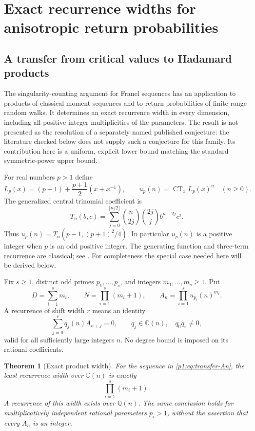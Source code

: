 \documentclass[11pt,a4paper]{article}
\newtheorem{theorem}{Theorem}[section]
\theoremstyle{definition}
\theoremstyle{remark}
\numberwithin{equation}{section}
\begin{document}
\section{Exact recurrence widths for anisotropic return probabilities}
\label{p1:sec:transfer-recurrences}

\subsection{A transfer from critical values to Hadamard products}

The singularity-counting argument for Franel sequences has an application
to products of classical moment sequences and to return probabilities of
finite-range random walks.  It determines an exact recurrence width in every
dimension, including all positive integer multiplicities of the parameters.
The result is not presented as the resolution of a separately named published
conjecture: the literature checked below does not supply such a conjecture for
this family.  Its contribution here is a uniform, explicit lower bound matching
the standard symmetric-power upper bound.

For real numbers $p>1$ define
\begin{equation}\label{p1:eq:transfer-Lp}
 L_p(x)=(p-1)+\frac{p+1}{2}(x+x^{-1}),\qquad
 u_p(n)=\operatorname{CT}_x L_p(x)^n \quad(n\geq0).
\end{equation}
The generalized central trinomial coefficient is
\[
 T_n(b,c)=\sum_{j=0}^{\lfloor n/2\rfloor}
 \binom n{2j}\binom{2j}j b^{n-2j}c^j.
\]
Thus $u_p(n)=T_n(p-1,(p+1)^2/4)$.  In particular $u_p(n)$ is a
positive integer when $p$ is an odd positive integer.  The generating
function and three-term recurrence are classical; see
\cite{p1:Noe2006transfer,p1:LWW2023transfer}.  For completeness the special
case needed here will be derived below.

Fix $s\geq1$, distinct odd primes $p_1,\ldots,p_s$, and integers
$m_1,\ldots,m_s\geq1$.  Put
\begin{equation}\label{p1:eq:transfer-An}
 D=\sum_{i=1}^s m_i,\qquad N=\prod_{i=1}^s(m_i+1),\qquad
 A_n=\prod_{i=1}^s u_{p_i}(n)^{m_i}.
\end{equation}
A recurrence of shift width $r$ means an identity
\[
 \sum_{j=0}^r q_j(n)A_{n+j}=0,
 \qquad q_j\in\mathbb C(n),\quad q_0q_r\ne0,
\]
valid for all sufficiently large integers $n$.  No degree bound is imposed
on its rational coefficients.

\begin{theorem}[Exact product width]\label{p1:thm:transfer-exact-width}
For the sequence in \eqref{p1:eq:transfer-An}, the least recurrence width
over $\mathbb C(n)$ is exactly
\[
 \boxed{\prod_{i=1}^s(m_i+1).}
\]
A recurrence of this width exists over $\mathbb Q(n)$.  The same conclusion
holds for multiplicatively independent rational parameters $p_i>1$, without
the assertion that every $A_n$ is an integer.
\end{theorem}
\end{document}
